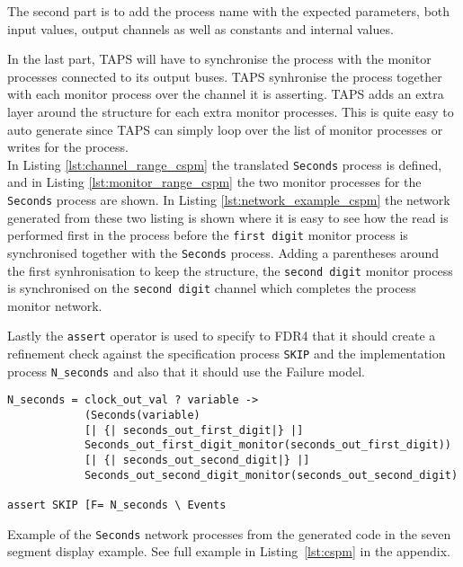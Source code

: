 The second part is to add the process name with the expected parameters, both input values, output channels as well as constants and internal values.

In the last part, TAPS will have to synchronise the process with the monitor processes connected to its output buses.
TAPS synhronise the process together with each monitor process over the channel it is asserting.
TAPS adds an extra layer around the structure for each extra monitor processes.
This is quite easy to auto generate since TAPS can simply loop over the list of monitor processes or writes for the process. \\

In Listing \ref{lst:channel_range_cspm} the translated \texttt{Seconds} process is defined, and in Listing \ref{lst:monitor_range_cspm} the two monitor processes for the \texttt{Seconds} process are shown.
In Listing \ref{lst:network_example_cspm} the network generated from these two listing is shown where it is easy to see how the read is performed first in the process before the \texttt{first digit} monitor process is synchronised together with the \texttt{Seconds} process. Adding a parentheses around the first synhronisation to keep the structure, the \texttt{second digit} monitor process is synchronised on the \texttt{second digit} channel which completes the process monitor network.

Lastly the \texttt{assert} operator is used to specify to FDR4 that it should create a refinement check against the specification process \texttt{SKIP} and the implementation process \texttt{N\_seconds} and also that it should use the Failure model.

\begin{listing}
\begin{verbatim}
N_seconds = clock_out_val ? variable ->
            (Seconds(variable)
            [| {| seconds_out_first_digit|} |]
            Seconds_out_first_digit_monitor(seconds_out_first_digit))
            [| {| seconds_out_second_digit|} |]
            Seconds_out_second_digit_monitor(seconds_out_second_digit)

assert SKIP [F= N_seconds \ Events
\end{verbatim}
\caption{Example of the \texttt{Seconds} network processes from the generated \cspm{} code in the seven segment display example. See full example in Listing~\ref{lst:cspm} in the appendix.}
\label{lst:network_example_cspm}
\end{listing}


